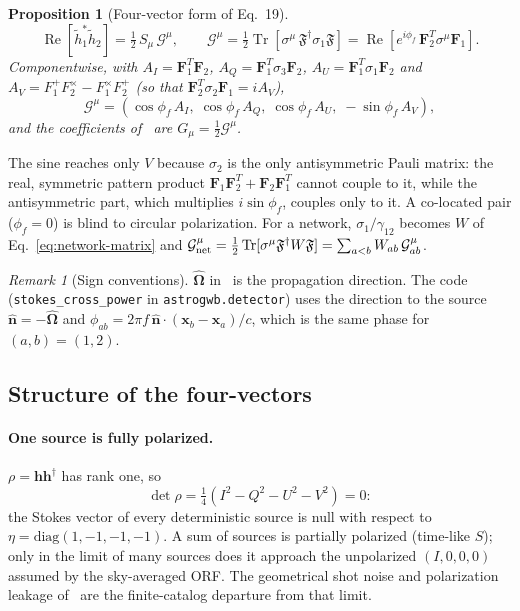 \documentclass[11pt]{article}
\newcommand{\Tr}{\operatorname{Tr}}
\renewcommand{\Re}{\operatorname{Re}}
\newcommand{\bh}{\bm{h}}
\newcommand{\bF}{\bm{F}}
\newcommand{\bOmega}{\hat{\bm{\Omega}}}
\newcommand{\cG}{\mathcal{G}}
\newcommand{\cF}{\mathfrak{F}}
\newcommand{\ft}[1]{\tilde{#1}}
\newtheorem{proposition}{Proposition}
\theoremstyle{remark}
\newtheorem{remark}{Remark}
\begin{document}
\begin{proposition}[Four-vector form of Eq.~19]
\begin{equation}
  \boxed{\;
  \Re\!\left[\ft h_1^* \ft h_2\right] = \tfrac12\, S_\mu\, \cG^\mu ,
  \qquad
  \cG^\mu = \tfrac12 \Tr\!\left[\sigma^\mu\, \cF^\dagger \sigma_1 \cF\right]
          = \Re\!\left[ e^{i\phi_f}\, \bF_2^T \sigma^\mu \bF_1 \right] .
  \;}
  \label{eq:four-vector}
\end{equation}
Componentwise, with
$A_I = \bF_1^T \bF_2$, $A_Q = \bF_1^T\sigma_3\bF_2$, $A_U = \bF_1^T\sigma_1\bF_2$
and $A_V = F_1^+F_2^\times - F_1^\times F_2^+$ (so that
$\bF_2^T\sigma_2\bF_1 = i A_V$),
\begin{equation}
  \cG^\mu = \left( \cos\phi_f\, A_I,\; \cos\phi_f\, A_Q,\;
                   \cos\phi_f\, A_U,\; -\sin\phi_f\, A_V \right),
\end{equation}
and the coefficients of~\cite[Eq.~19]{Zhong2026} are
$G_\mu = \tfrac12 \cG^\mu$.
\end{proposition}

The sine reaches only $V$ because $\sigma_2$ is the only antisymmetric Pauli
matrix: the real, symmetric pattern product $\bF_1\bF_2^T + \bF_2\bF_1^T$
cannot couple to it, while the antisymmetric part, which multiplies
$i\sin\phi_f$, couples only to it. A co-located pair ($\phi_f = 0$) is blind to
circular polarization. For a network, $\sigma_1/\gamma_{12}$ becomes $W$ of
Eq.~\eqref{eq:network-matrix} and
$\cG^\mu_{\rm net} = \tfrac12\Tr[\sigma^\mu\cF^\dagger W \cF]
= \sum_{a<b} W_{ab}\, \cG^\mu_{ab}$.

\begin{remark}[Sign conventions]
$\bOmega$ in~\cite{Zhong2026} is the propagation direction. The code
(\texttt{stokes\_cross\_power} in \texttt{astrogwb.detector}) uses the
direction to the source $\hat{\bm n} = -\bOmega$ and
$\phi_{ab} = 2\pi f\,\hat{\bm n}\cdot(\bm x_b - \bm x_a)/c$, which is the same
phase for $(a,b) = (1,2)$.
\end{remark}

\subsection{Structure of the four-vectors}

\paragraph{One source is fully polarized.}
$\rho = \bh\bh^\dagger$ has rank one, so
\begin{equation}
  \det\rho = \tfrac14\left(I^2 - Q^2 - U^2 - V^2\right) = 0 :
\end{equation}
the Stokes vector of every deterministic source is null with respect to
$\eta = \mathrm{diag}(1,-1,-1,-1)$. A sum of sources is partially polarized
(time-like $S$); only in the limit of many sources does it approach the
unpolarized $(I,0,0,0)$ assumed by the sky-averaged ORF. The geometrical shot
noise and polarization leakage of~\cite{Zhong2026} are the finite-catalog
departure from that limit.
\end{document}
